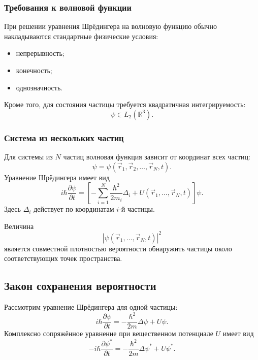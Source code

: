 \documentclass[12pt,a4paper]{article}
\begin{document}
\subsubsection{Требования к волновой функции}

При решении уравнения Шрёдингера на волновую функцию обычно
накладываются стандартные физические условия:
\begin{itemize}
    \item непрерывность;
    \item конечность;
    \item однозначность.
\end{itemize}

Кроме того, для состояния частицы требуется квадратичная
интегрируемость:
\[
    \psi\in L_2(\mathbb R^3).
\]


\subsubsection{Система из нескольких частиц}

Для системы из $N$ частиц волновая функция зависит от координат всех
частиц:
\[
    \boxed{
        \psi
        =
        \psi(
            \vec r_1,\vec r_2,\ldots,\vec r_N,t
        )
    }.
\]
Уравнение Шрёдингера имеет вид
\[
    \boxed{
    i\hbar\frac{\partial\psi}{\partial t}
    =
    \left[
        -\sum_{i=1}^{N}
        \frac{\hbar^2}{2m_i}\Delta_i
        +
        U(
            \vec r_1,\ldots,\vec r_N,t
        )
    \right]\psi
    }.
\]
Здесь $\Delta_i$ действует по координатам $i$-й частицы.

Величина
\[
    \boxed{
        |\psi(
            \vec r_1,\ldots,\vec r_N,t
        )|^2
    }
\]
является совместной плотностью вероятности обнаружить частицы около
соответствующих точек пространства.


\subsection{Закон сохранения вероятности}

Рассмотрим уравнение Шрёдингера для одной частицы:
\[
    i\hbar
    \frac{\partial\psi}{\partial t}
    =
    -\frac{\hbar^2}{2m}\Delta\psi
    +
    U\psi.
\]
Комплексно сопряжённое уравнение при вещественном потенциале $U$ имеет
вид
\[
    -i\hbar
    \frac{\partial\psi^*}{\partial t}
    =
    -\frac{\hbar^2}{2m}\Delta\psi^*
    +
    U\psi^*.
\]
\end{document}
